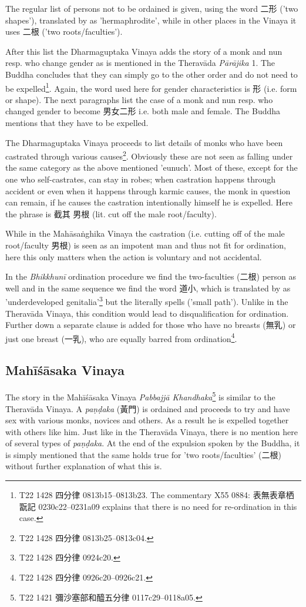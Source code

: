 The regular list of persons not to be ordained is given, using the word 二形 ('two shapes'), translated by \cite{bodhi} as 'hermaphrodite', while in other places in the Vinaya it uses 二根 ('two roots/faculties'). 

After this list the Dharmaguptaka Vinaya adds the story of a monk and nun resp. who change gender as is mentioned in the Theravāda {\em Pārājika} 1. The Buddha concludes that they can simply go to the other order and do not need to be expelled\footnote{T22 1428 四分律 0813b15–0813b23. The commentary X55 0884: 表無表章栖翫記 0230c22–0231a09 explains that there is no need for re-ordination in this case.}. Again, the word used here for gender characteristics is 形 (i.e. form or shape). The next paragraphs list the case of a monk and nun resp. who changed gender to become 男女二形 i.e. both male and female. The Buddha mentions that they have to be expelled.

The Dharmaguptaka Vinaya proceeds to list details of monks who have been castrated through various causes\footnote{T22 1428 四分律 0813b25–0813c04.}. Obviously these are not seen as falling under the same category as the above mentioned 'eunuch'. Most of these, except for the one who self-castrates, can stay in robes; when castration happens through accident or even when it happens through karmic causes, the monk in question can remain, if he causes the castration intentionally himself he is expelled. Here the phrase is 截其 男根 (lit. cut off the male root/faculty).

While in the Mahāsaṅghika Vinaya the castration (i.e. cutting off of the male root/faculty 男根) is seen as an impotent man and thus not fit for ordination, here this only matters when the action is voluntary and not accidental.

In the {\em Bhikkhunī} ordination procedure we find the two-faculties (二根) person as well and in the same sequence we find the word 道小, which is translated by \cite{bodhi} as 'underdeveloped genitalia'\footnote{T22 1428 四分律 0924c20.} but the literally spells ('small path'). Unlike in the Theravāda Vinaya, this condition would lead to disqualification for ordination. Further down a separate clause is added for those who have no breasts (無乳) or just one breast (一乳), who are equally barred from ordination\footnote{T22 1428 四分律 0926c20–0926c21.}.


\subsection{Mahīśāsaka Vinaya}
The story in the Mahīśāsaka Vinaya {\em Pabbajjā Khandhaka}\footnote{T22 1421 彌沙塞部和醯五分律 0117c29–0118a05.} is similar to the Theravāda Vinaya. A {\em paṇḍaka} (黃門) is ordained and proceeds to try and have sex with various monks, novices and others. As a result he is expelled together with others like him. Just like in the Theravāda Vinaya, there is no mention here of several types of {\em paṇḍaka}. At the end of the expulsion spoken by the Buddha, it is simply mentioned that the same holds true for 'two roots/faculties' (二根) without further explanation of what this is.

